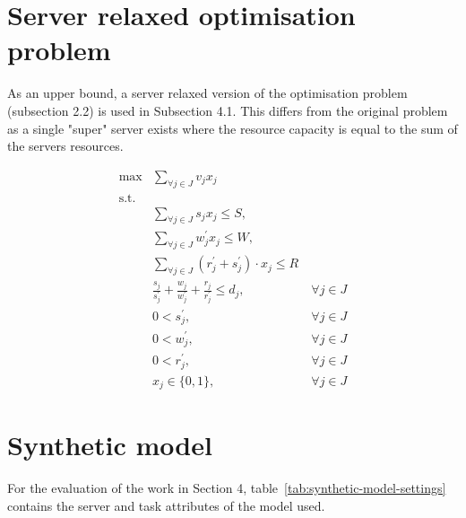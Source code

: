 \documentclass[sigconf]{aamas}
\begin{document}
\section{Server relaxed optimisation problem}
As an upper bound, a server relaxed version of the optimisation problem (subsection 2.2) is used in Subsection 4.1. This differs from the original problem as a single "super" server exists where the resource capacity is equal to the sum of the servers resources. 

\begin{align}[h]
    \max & \sum_{\forall j \in J} v_j x_j \label{eq:relaxed-objective} \\
    \mbox{s.t.} \nonumber \\
    & \sum_{\forall j \in J} s_j x_j \leq S, \label{eq:relaxed-server-storage-constraint} \\
    & \sum_{\forall j \in J} w^{'}_j x_j \leq W,  \label{eq:relaxed-server-computation-constraint} \\
    & \sum_{\forall j \in J} (r^{'}_j + s^{'}_j) \cdot x_j \leq R \label{eq:relaxed-server-bandwidth-constraint} \\
    & \frac{s_j}{s^{'}_j} + \frac{w_j}{w^{'}_j} + \frac{r_j}{r^{'}_j} \leq d_j, &~ \forall{j \in J} \label{eq:relaxed-task-deadline} \\
    & 0 < s^{'}_j, &~ \forall{j \in J} \label{eq:relaxed-loading-speeds} \\
    & 0 < w^{'}_j, &~ \forall{j \in J} \label{eq:relaxed-compute-speeds} \\
    & 0 < r^{'}_j, &~ \forall{j \in J} \label{eq:relaxed-sending-speeds} \\
    & x_j \in \{0, 1\}, &~ \forall{j \in J} \label{eq:relaxed-task-allocation}
\end{align}

\section{Synthetic model}
For the evaluation of the work in Section 4, table~\ref{tab:synthetic-model-settings} contains the server and task attributes of the model used.
\end{document}
